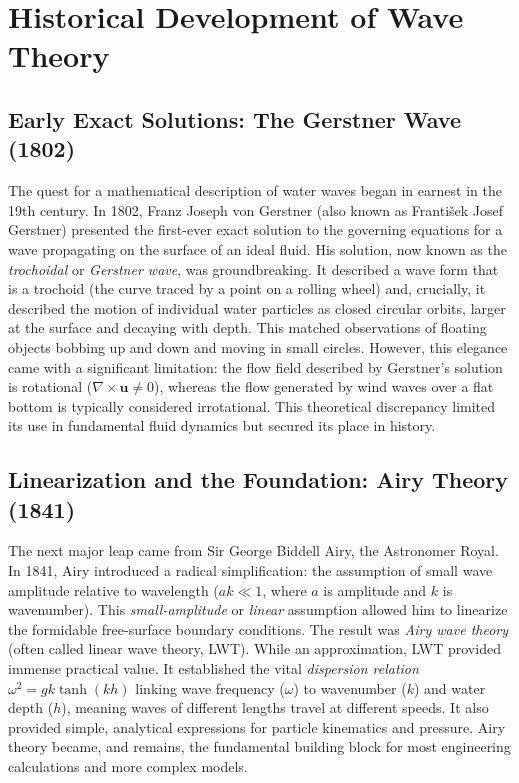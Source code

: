 \documentclass[11pt,a4paper]{article}
\begin{document}
\section{Historical Development of Wave Theory}
\subsection{Early Exact Solutions: The Gerstner Wave (1802)}
The quest for a mathematical description of water waves began in earnest in the 19th century. In 1802, Franz Joseph von Gerstner (also known as František Josef Gerstner) presented the first-ever exact solution to the governing equations for a wave propagating on the surface of an ideal fluid. His solution, now known as the \emph{trochoidal} or \emph{Gerstner wave}, was groundbreaking. It described a wave form that is a trochoid (the curve traced by a point on a rolling wheel) and, crucially, it described the motion of individual water particles as closed circular orbits, larger at the surface and decaying with depth. This matched observations of floating objects bobbing up and down and moving in small circles. However, this elegance came with a significant limitation: the flow field described by Gerstner's solution is rotational ($\nabla \times \mathbf{u} \neq 0$), whereas the flow generated by wind waves over a flat bottom is typically considered irrotational. This theoretical discrepancy limited its use in fundamental fluid dynamics but secured its place in history.

\subsection{Linearization and the Foundation: Airy Theory (1841)}
The next major leap came from Sir George Biddell Airy, the Astronomer Royal. In 1841, Airy introduced a radical simplification: the assumption of small wave amplitude relative to wavelength ($ak \ll 1$, where $a$ is amplitude and $k$ is wavenumber). This \emph{small-amplitude} or \emph{linear} assumption allowed him to linearize the formidable free-surface boundary conditions. The result was \emph{Airy wave theory} (often called linear wave theory, LWT). While an approximation, LWT provided immense practical value. It established the vital \emph{dispersion relation} $\omega^2 = gk \tanh(kh)$ linking wave frequency ($\omega$) to wavenumber ($k$) and water depth ($h$), meaning waves of different lengths travel at different speeds. It also provided simple, analytical expressions for particle kinematics and pressure. Airy theory became, and remains, the fundamental building block for most engineering calculations and more complex models.
\end{document}
